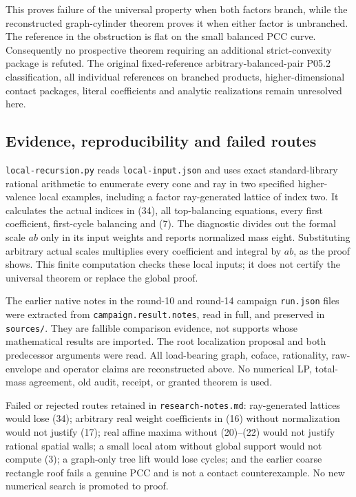 \documentclass[
  11pt,
]{article}
\begin{document}
This proves failure of the universal property when both factors branch,
while the reconstructed graph-cylinder theorem proves it when either
factor is unbranched. The reference in the obstruction is flat on the
small balanced PCC curve. Consequently no prospective theorem requiring
an additional strict-convexity package is refuted. The original
fixed-reference arbitrary-balanced-pair P05.2 classification, all
individual references on branched products, higher-dimensional contact
packages, literal coefficients and analytic realizations remain
unresolved here.

\subsection{Evidence, reproducibility and failed
routes}\label{evidence-reproducibility-and-failed-routes}

\texttt{local-recursion.py} reads \texttt{local-input.json} and uses
exact standard-library rational arithmetic to enumerate every cone and
ray in two specified higher-valence local examples, including a factor
ray-generated lattice of index two. It calculates the actual indices in
(34), all top-balancing equations, every first coefficient, first-cycle
balancing and (7). The diagnostic divides out the formal scale \(ab\)
only in its input weights and reports normalized mass eight.
Substituting arbitrary actual scales multiplies every coefficient and
integral by \(ab\), as the proof shows. This finite computation checks
these local inputs; it does not certify the universal theorem or replace
the global proof.

The earlier native notes in the round-10 and round-14 campaign
\texttt{run.json} files were extracted from
\texttt{campaign.result.notes}, read in full, and preserved in
\texttt{sources/}. They are fallible comparison evidence, not supports
whose mathematical results are imported. The root localization proposal
and both predecessor arguments were read. All load-bearing graph,
coface, rationality, raw-envelope and operator claims are reconstructed
above. No numerical LP, total-mass agreement, old audit, receipt, or
granted theorem is used.

Failed or rejected routes retained in \texttt{research-notes.md}:
ray-generated lattices would lose (34); arbitrary real weight
coefficients in (16) without normalization would not justify (17); real
affine maxima without (20)--(22) would not justify rational spatial
walls; a small local atom without global support would not compute (3);
a graph-only tree lift would lose cycles; and the earlier coarse
rectangle roof fails a genuine PCC and is not a contact counterexample.
No new numerical search is promoted to proof.
\end{document}
